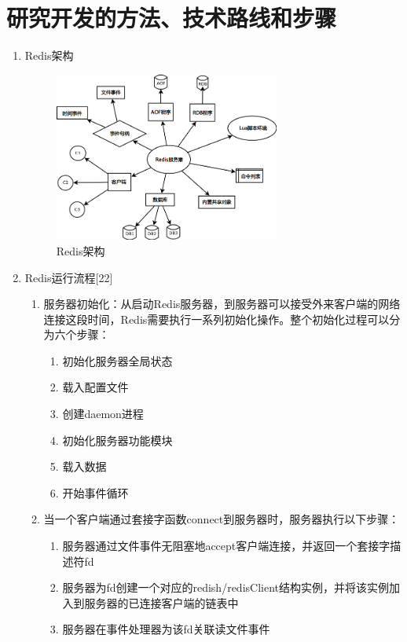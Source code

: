 \documentclass[proposal]{zjutreport}
\begin{document}
\chapter{研究开发的方法、技术路线和步骤}
\begin{enumerate}[label=（\arabic*）]
\item{Redis架构
\begin{figure}[htbp]
\centering
\includegraphics[width=0.7\textwidth]{redis-server}
\caption{Redis架构}\label{fig:redis-server}
\vspace{\baselineskip}
\end{figure}
}%

\item{Redis运行流程[22]

\begin{enumerate}[label=\arabic*.]
\item{服务器初始化：从启动Redis服务器，到服务器可以接受外来客户端的网络连接这段时间，Redis需要执行一系列初始化操作。整个初始化过程可以分为六个步骤：
\begin{enumerate}[label=\Roman{*}.]
\item{初始化服务器全局状态}
\item{载入配置文件}
\item{创建daemon进程}
\item{初始化服务器功能模块}
\item{载入数据}
\item{开始事件循环}
\end{enumerate}
}

\item{当一个客户端通过套接字函数connect到服务器时，服务器执行以下步骤：
\begin{enumerate}[label=\Roman{*}.]
\item{服务器通过文件事件无阻塞地accept客户端连接，并返回一个套接字描述符fd}
\item{服务器为fd创建一个对应的redish/redisClient结构实例，并将该实例加入到服务器的已连接客户端的链表中}
\item{服务器在事件处理器为该fd关联读文件事件}
\end{enumerate}
}


\end{enumerate}}
\end{enumerate}
\end{document}
